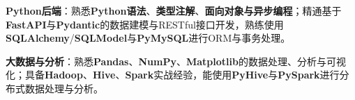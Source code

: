\item \textbf{Python后端}：熟悉\textbf{Python语法}、\textbf{类型注解}、\textbf{面向对象与异步编程}；精通基于\textbf{FastAPI}与\textbf{Pydantic}的数据建模与RESTful接口开发，熟练使用\textbf{SQLAlchemy}/\textbf{SQLModel}与\textbf{PyMySQL}进行ORM与事务处理。

\item \textbf{大数据与分析}：熟悉\textbf{Pandas}、\textbf{NumPy}、\textbf{Matplotlib}的数据处理、分析与可视化；具备\textbf{Hadoop}、\textbf{Hive}、\textbf{Spark}实战经验，能使用\textbf{PyHive}与\textbf{PySpark}进行分布式数据处理与分析。